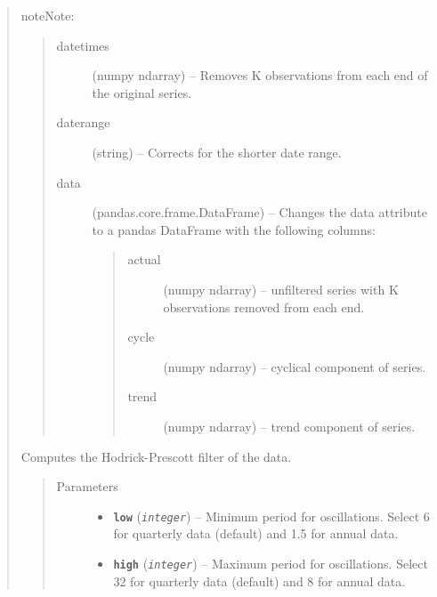 \documentclass[letterpaper,10pt,english]{sphinxmanual}
\begin{document}
\begin{fulllineitems}
\begin{quote}
\begin{fulllineitems}
\begin{notice}{note}{Note:}
\begin{quote}
\begin{description}
\item[{datetimes}] \leavevmode
(numpy ndarray) --  Removes K observations from each end of the original series.

\item[{daterange}] \leavevmode
(string) -- Corrects for the shorter date range.

\item[{data}] \leavevmode
(pandas.core.frame.DataFrame) --  Changes the data attribute to a pandas DataFrame with the following columns:
\begin{quote}\begin{description}
\item[{actual}] \leavevmode
(numpy ndarray) -- unfiltered series with K observations removed from each end.

\item[{cycle}] \leavevmode
(numpy ndarray) --  cyclical component of series.

\item[{trend}] \leavevmode
(numpy ndarray) --  trend component of series.

\end{description}\end{quote}

\end{description}\end{quote}
\end{notice}

\end{fulllineitems}


\begin{fulllineitems}
\label{series_class:fredpy.series.cffilter}
Computes the Hodrick-Prescott filter of the data.
\begin{quote}\begin{description}
\item[{Parameters}] \leavevmode\begin{itemize}
\item {} 
\textbf{\texttt{low}} (\emph{\texttt{integer}}) -- Minimum period for oscillations. Select 6 for quarterly data (default) and 1.5 for annual data.

\item {} 
\textbf{\texttt{high}} (\emph{\texttt{integer}}) -- Maximum period for oscillations. Select 32 for quarterly data (default) and 8 for annual data.


\end{itemize}
\end{description}
\end{quote}
\end{fulllineitems}
\end{quote}
\end{fulllineitems}
\end{document}
